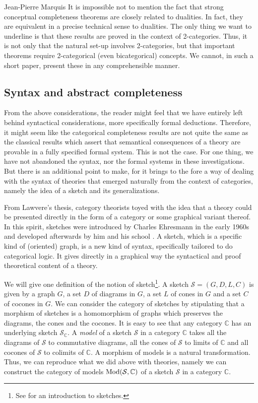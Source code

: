 \begin{artengenv}{Jean-Pierre Marquis}
It is impossible not to mention the fact that strong conceptual completeness theorems are closely related to dualities. In fact, they are equivalent in a precise technical sense to dualities. The only thing we want to underline is that these results are proved in the context of 2-categories. Thus, it is not only that the natural set-up involves 2-categories, but that important theorems require 2-categorical (even bicategorical) concepts. We cannot, in such a short paper, present these in any comprehensible manner. 

\subsection{Syntax and abstract completeness}

From the above considerations, the reader might feel that we have entirely left behind syntactical considerations, more specifically formal deductions. Therefore, it might seem like the categorical completeness results are not quite the same as the classical results which assert that semantical consequences of a theory are provable in a fully specified formal system. This is not the case. For one thing, we have not abandoned the syntax, nor the formal systems in these investigations. But there is an additional point to make, for it brings to the fore a way of dealing with the syntax of theories that emerged naturally from the context of categories, namely the idea of a sketch and its generalizations. 

From Lawvere's thesis, category theorists toyed with the idea that a theory could be presented directly in the form of a category or some graphical variant thereof. In this spirit, sketches were introduced by Charles Ehresmann in the early 1960s and developed afterwards by him and his school \parencite[see][for instance]{Ehresmann1967,Ehresmann1968,Lair2001,Lair2002,Lair2003}.  A sketch, which is a specific kind of (oriented) graph, is a new kind of syntax, specifically tailored to do categorical logic. It gives directly in a graphical way the syntactical and proof theoretical content of a theory.

We will give one definition of the notion of sketch\footnote{See \parencite{BarrWells1990, BarrWells2005} for an introduction to sketches.}. A sketch $\mathcal{S} = (G, D, L, C)$ is given by a graph $G$, a set $D$ of diagrams in $G$, a set $L$ of cones in $G$ and a set $C$ of cocones in $G$. We can consider the category of sketches by stipulating that a morphism of sketches is a homomorphism of graphs which preserves the diagrams, the cones and the cocones. It is easy to see that any category $\mathbb{C}$ has an underlying sketch $\mathcal{S}_{\mathbb{C}}$. A \emph{model} of a sketch $\mathcal{S}$ in a category $\mathbb{C}$ takes all the diagrams of $\mathcal{S}$ to commutative diagrams, all the cones of $\mathcal{S}$ to limits  of $\mathbb{C}$ and all cocones of $\mathcal{S}$ to colimits of $\mathbb{C}$. A morphism of models is a natural transformation. Thus, we can reproduce what we did above with theories, namely we can construct the category of models $\operatorname{\mathrm{Mod}}(\mathcal{S}, \mathbb{C})$ of a sketch $\mathcal{S}$ in a category $\mathbb{C}$.


\end{artengenv}

